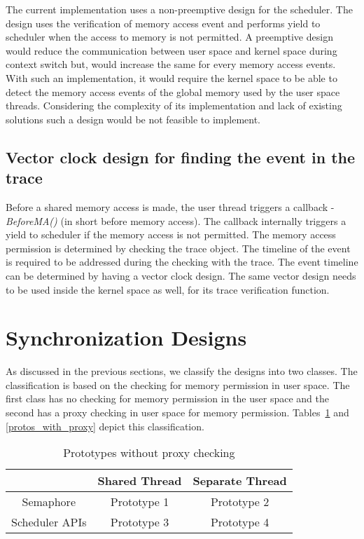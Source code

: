 The current implementation uses a non-preemptive design for the scheduler. 
The design uses the verification of memory access event and performs yield to scheduler when the access to memory is not permitted. 
A preemptive design would reduce the communication between user space and kernel space during context switch but, would increase the same for every memory access events. 
With such an implementation, it would require the kernel space to be able to detect the memory access events of the global memory used by the user space threads. 
Considering the complexity of its implementation and lack of existing solutions such a design would be not feasible to implement. 


\subsection{Vector clock design for finding the event in the trace}

Before a shared memory access is made, the user thread triggers a callback - \emph{BeforeMA()} (in short before memory access). 
The callback internally triggers a yield to scheduler if the memory access is not permitted. 
The memory access permission is determined by checking the trace object. 
The timeline of the event is required to be addressed during the checking with the trace. 
The event timeline can be determined by having a vector clock design. 
The same vector design needs to be used inside the kernel space as well, for its trace verification function.



\section{Synchronization Designs \label{sync_des}}

As discussed in the previous sections, we classify the designs into two classes. 
The classification is based on the checking for memory permission in user space. 
The first class has no checking for memory permission in the user space and the second has a proxy checking in user space for memory permission. 
Tables~\ref{protos_without_proxy} and \ref{protos_with_proxy} depict this classification.

\begin{table}[h]
\begin{center}
 \begin{tabular}{|c c c|} 
 \hline
 & Shared Thread & Separate Thread\\ %
 \hline
Semaphore & Prototype 1 & Prototype 2\\
Scheduler APIs & Prototype 3 & Prototype 4\\
\hline
\end{tabular}
\end{center}
\caption{Prototypes without proxy checking}
\label{protos_without_proxy}
\end{table}

